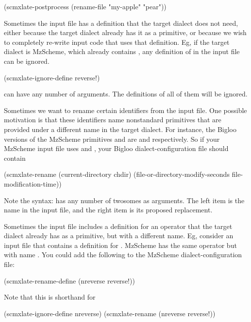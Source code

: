 \begintts
(scmxlate-postprocess
  (rename-file "my-apple" "pear"))
\endtt


Sometimes the input file has a definition that the
target dialect does not need, either because the target
dialect already has it as a primitive, or because we
wish to completely re-write input code that uses that
definition.  Eg, if the target dialect is MzScheme,
which already contains , any definition of
 in the input file can be ignored.

\begintts
(scmxlate-ignore-define reverse!)
\endtt

 can have any number of
arguments.  The definitions of all of them will be
ignored.


Sometimes we want to rename certain identifiers from
the input file.  One possible motivation is that
these identifiers name nonstandard primitives that are
provided under a different name in the target dialect.
For instance, the Bigloo versions of the MzScheme
primitives  and
 are  and
 respectively.  So if your
MzScheme input file uses  and
, your Bigloo
dialect-configuration file should contain

\begintts
(scmxlate-rename
 (current-directory chdir)
 (file-or-directory-modify-seconds file-modification-time))
\endtt

Note the syntax:  has any number of
twosomes as arguments.  The left item is the name in
the input file, and the right item is its proposed
replacement.


Sometimes the input file includes a definition
for an operator that the target dialect already has as
a primitive, but with a different name.   Eg, consider
an input file that contains a definition for
.  MzScheme has the same operator but with
name .  You could add the following to
the MzScheme dialect-configuration file:

\begintts
(scmxlate-rename-define
  (nreverse reverse!))
\endtt

Note that this is shorthand for

\begintts
(scmxlate-ignore-define nreverse)
(scmxlate-rename
  (nreverse reverse!))
\endtt
{}


